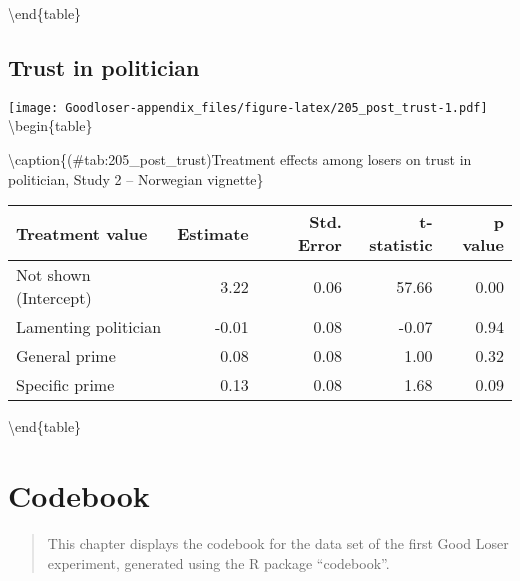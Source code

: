 \documentclass[
]{book}
\begin{document}
\textbackslash end\{table\}

\hypertarget{trust-in-politician-3}{%
\section{Trust in politician}\label{trust-in-politician-3}}

\texttt{[image: Goodloser-appendix\_files/figure-latex/205\_post\_trust-1.pdf]} \textbackslash begin\{table\}

\textbackslash caption\{(\#tab:205\_post\_trust)Treatment effects among losers on trust in politician, Study 2 -- Norwegian vignette\}
\centering

\begin{tabular}[t]{lrrrr}
\toprule
Treatment value & Estimate & Std. Error & t-statistic & p value\\
\midrule
Not shown (Intercept) & 3.22 & 0.06 & 57.66 & 0.00\\
Lamenting politician & -0.01 & 0.08 & -0.07 & 0.94\\
General prime & 0.08 & 0.08 & 1.00 & 0.32\\
Specific prime & 0.13 & 0.08 & 1.68 & 0.09\\
\bottomrule
\end{tabular}

\textbackslash end\{table\}

\hypertarget{codebook-1}{%
\chapter{Codebook}\label{codebook-1}}

\begin{quote}
This chapter displays the codebook for the data set of the first Good Loser experiment, generated using the R package ``codebook''.
\end{quote}
\end{document}
